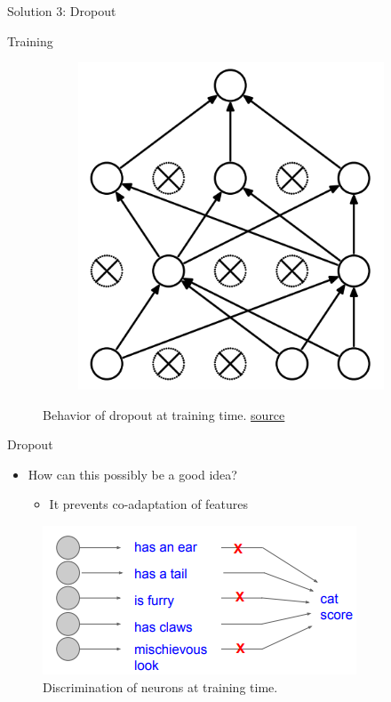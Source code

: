 \begin{frame}{Solution 3: Dropout}
\begin{block}{Training}
\begin{figure}[H]
\begin{subfigure}[b]{0.45\textwidth}
				\includegraphics[height=0.4\textheight]{Figs/Dropout-after.png}
			\end{subfigure}
			\caption{Behavior of dropout at training time. \href{https://www.cs.toronto.edu/~hinton/absps/JMLRdropout.pdf}{source}}
		\end{figure}
	\end{block}
\end{frame}
\begin{frame}{Dropout}
	\begin{itemize}
		\item How can this possibly be a good idea?
		\begin{itemize}
			\item It prevents co-adaptation of features
		\end{itemize}
	\end{itemize}
	\begin{figure}[H]
		\centering
		\includegraphics[height=0.4\textheight]{Figs/section_4/dropout_why.png}
		\caption{Discrimination of neurons at training time. \cite{cs231n-2018-lecture7}}
	\end{figure}
\end{frame}
